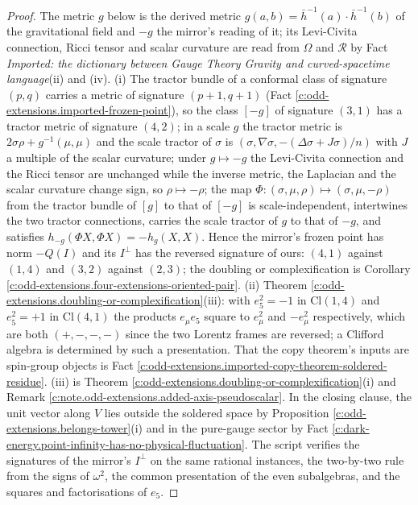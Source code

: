 \documentclass[11pt]{article}
\theoremstyle{definition}
\theoremstyle{plain}
\providecommand{\Cl}{}\renewcommand{\Cl}{\mathrm{Cl}}
\providecommand{\hb}{}\renewcommand{\hb}{\bar{h}}
\begin{document}
\begin{proof}
The metric $g$ below is the derived metric $g(a,b) = \hb^{-1}(a) \cdot \hb^{-1}(b)$ of the gravitational field and $-g$ the mirror's reading of it; its Levi-Civita connection, Ricci tensor and scalar curvature are read from $\Omega$ and $\mathcal{R}$ by Fact \emph{Imported: the dictionary between Gauge Theory Gravity and curved-spacetime language}(ii) and (iv). (i) The tractor bundle of a conformal class of signature $(p,q)$ carries a metric of signature $(p+1,q+1)$ (Fact \ref{c:odd-extensions.imported-frozen-point}), so the class $[-g]$ of signature $(3,1)$ has a tractor metric of signature $(4,2)$; in a scale $g$ the tractor metric is $2\sigma\rho + g^{-1}(\mu,\mu)$ and the scale tractor of $\sigma$ is $(\sigma, \nabla\sigma, -(\Delta\sigma + J\sigma)/n)$ with $J$ a multiple of the scalar curvature; under $g \mapsto -g$ the Levi-Civita connection and the Ricci tensor are unchanged while the inverse metric, the Laplacian and the scalar curvature change sign, so $\rho \mapsto -\rho$; the map $\Phi: (\sigma, \mu, \rho) \mapsto (\sigma, \mu, -\rho)$ from the tractor bundle of $[g]$ to that of $[-g]$ is scale-independent, intertwines the two tractor connections, carries the scale tractor of $g$ to that of $-g$, and satisfies $h_{-g}(\Phi X, \Phi X) = -h_{g}(X, X)$. Hence the mirror's frozen point has norm $-Q(I)$ and its $I^{\perp}$ has the reversed signature of ours: $(4,1)$ against $(1,4)$ and $(3,2)$ against $(2,3)$; the doubling or complexification is Corollary \ref{c:odd-extensions.four-extensions-oriented-pair}. (ii) Theorem \ref{c:odd-extensions.doubling-or-complexification}(iii): with $e_{5}^{2} = -1$ in $\Cl(1,4)$ and $e_{5}^{2} = +1$ in $\Cl(4,1)$ the products $e_{\mu}e_{5}$ square to $e_{\mu}^{2}$ and $-e_{\mu}^{2}$ respectively, which are both $(+,-,-,-)$ since the two Lorentz frames are reversed; a Clifford algebra is determined by such a presentation. That the copy theorem's inputs are spin-group objects is Fact \ref{c:odd-extensions.imported-copy-theorem-soldered-residue}. (iii) is Theorem \ref{c:odd-extensions.doubling-or-complexification}(i) and Remark \ref{c:note.odd-extensions.added-axis-pseudoscalar}. In the closing clause, the unit vector along $V$ lies outside the soldered space by Proposition \ref{c:odd-extensions.belongs-tower}(i) and in the pure-gauge sector by Fact \ref{c:dark-energy.point-infinity-has-no-physical-fluctuation}. The script verifies the signatures of the mirror's $I^{\perp}$ on the same rational instances, the two-by-two rule from the signs of $\omega^{2}$, the common presentation of the even subalgebras, and the squares and factorisations of $e_{5}$.

\end{proof}
\end{document}
